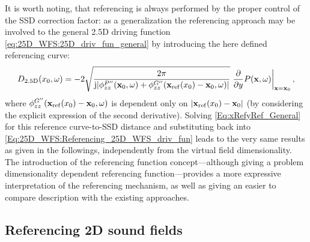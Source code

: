\vspace{3mm}
It is worth noting, that referencing is always performed by the proper control of the SSD correction factor: as a generalization the referencing approach may be involved to the general 2.5D driving function \eqref{eq:25D_WFS:25D_driv_fun_general} by introducing the here defined referencing curve:
\begin{equation}
D_{2.5\mathrm{D}}(x_0,\omega) = -2
\sqrt{\frac{2\pi}{\mathrm{j} |\phi_{zz}^{P''}(\mathbf{x}_0, \omega) + \phi_{zz}^{G''}(\mathbf{x}_{\mathrm{ref}}(x_0) - \mathbf{x}_0,\omega)|}}
\left. \frac{\partial}{\partial y} P(\mathbf{x},\omega) \right|_{\mathbf{x} = \mathbf{x}_0},
\label{Eq:25D_WFS:Referencing_25D_WFS_driv_fun}
\end{equation}
where $\phi_{zz}^{G''}(\mathbf{x}_{\mathrm{ref}}(x_0) - \mathbf{x}_0,\omega)$ is dependent only on $|\mathbf{x}_{\mathrm{ref}}(x_0) - \mathbf{x}_0|$ (by considering the explicit expression of the second derivative).
Solving \eqref{Eq:xRefyRef_General} for this reference curve-to-SSD distance and substituting back into \eqref{Eq:25D_WFS:Referencing_25D_WFS_driv_fun} leads to the very same results as given in the followings, independently from the virtual field dimensionality.
The introduction of the referencing function concept---although giving a problem dimensionality dependent referencing function---provides a more expressive interpretation of the referencing mechanism, as well as giving an easier to compare description with the existing approaches.


\subsection{Referencing 2D sound fields}


